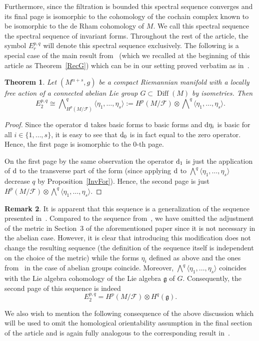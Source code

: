 \documentclass[pdftex]{sigma}
\numberwithin{equation}{section}
\newtheorem{tw}{Theorem}[section]
\theoremstyle{definition}
\newtheorem{rem}[tw]{Remark}
\begin{document}
Furthermore, since the filtration is bounded this spectral sequence converges and its final page is isomorphic to the cohomology of the cochain complex  known to be isomorphic to the de Rham cohomology of $M$. We call this spectral sequence the spectral sequence of invariant forms. Throughout the rest of the article, the symbol $E_{r}^{p,q}$ will denote this spectral sequence exclusively. The following is a special case of the main result from~\cite{My4} (which we recalled at the beginning of this article as Theorem~\ref{RecG}) which can be in our setting proved verbatim as in~\cite{My3}.
\begin{tw}%
Let $(M^{n+s},g)$ be a compact Riemannian manifold with a locally free action of a connected abelian Lie group $G\subset \operatorname{Diff}(M)$ by isometries. Then
\[E_2^{p,q}\cong \bigwedge\nolimits_{H^{p}(M\slash\mathcal{F})}^q\langle\eta_1,\dots,\eta_s\rangle:=H^{p}(M\slash\mathcal{F})\otimes\bigwedge\nolimits^q\langle\eta_1,\dots,\eta_s\rangle.\]
\end{tw}

\begin{proof} Since the operator ${\rm d}$ takes basic forms to basic forms and ${\rm d}\eta_i$ is basic for all $i\in\{1,\dots,s\}$, it is easy to see that ${\rm d}_0$ is in fact equal to the zero operator. Hence, the first page is isomorphic to the $0$-th page.

On the first page by the same observation the operator ${\rm d}_1$ is just the application of ${\rm d}$ to the transverse part of the form (since applying ${\rm d}$ to $\bigwedge ^q\langle\eta_1,\dots,\eta_s\rangle$ decrease $q$ by Proposition~\ref{InvFor}). Hence, the second page is just $H^{p}(M\slash\mathcal{F})\otimes\bigwedge ^q\langle\eta_1,\dots,\eta_s\rangle$.
\end{proof}

\begin{rem} It is apparent that this sequence is a generalization of the sequence presented in~\cite{My3}. Compared to the sequence from~\cite{My4}, we have omitted the adjustment of the metric in Section~3 of the aforementioned paper since it is not necessary in the abelian case. However, it is clear that introducing this modification does not change the resulting sequence (the definition of the sequence itself is independent on the choice of the metric) while the forms $\eta_i$ defined as above and the ones from~\cite{My4} in the case of abelian groups coincide. Moreover, $\bigwedge^q\langle\eta_1,\dots,\eta_s\rangle$ coincides with the Lie algebra cohomology of the Lie algebra $\mathfrak{g}$ of $G$. Consequently, the second page of this sequence is indeed
\[E^{p,q}_2=H^p(M\slash\mathcal{F})\otimes H^{q}(\mathfrak{g}).\]
\end{rem}
We also wish to mention the following consequence of the above discussion which will be used to omit the homological orientability assumption in the final section of the article and is again fully analogous to the corresponding result in~\cite{My3}.
\end{document}
